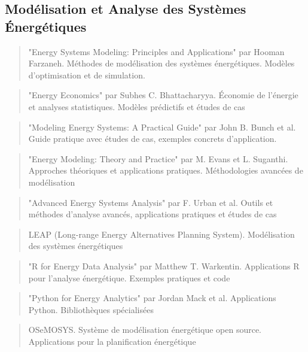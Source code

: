 \documentclass[a4paper,11pt]{report}
\begin{document}
\subsection{Modélisation et Analyse des Systèmes Énergétiques}\label{moduxe9lisation-et-analyse-des-systuxe8mes-uxe9nerguxe9tiques}

\begin{quote}
"Energy Systems Modeling: Principles and Applications" par Hooman Farzaneh. Méthodes de modélisation des systèmes énergétiques. Modèles d'optimisation et de simulation.
\end{quote}

\begin{quote}
"Energy Economics" par Subhes C. Bhattacharyya. Économie de l'énergie et analyses statistiques. Modèles prédictifs et études de cas
\end{quote}

\begin{quote}
"Modeling Energy Systems: A Practical Guide" par John B. Bunch et al. Guide pratique avec études de cas, exemples concrets d'application.
\end{quote}

\begin{quote}
"Energy Modeling: Theory and Practice" par M. Evans et L. Suganthi. Approches théoriques et applications pratiques. Méthodologies avancées de modélisation
\end{quote}

\begin{quote}
"Advanced Energy Systems Analysis" par F. Urban et al. Outils et méthodes d'analyse avancés, applications pratiques et études de cas
\end{quote}

\begin{quote}
LEAP (Long-range Energy Alternatives Planning System). Modélisation des systèmes énergétiques
\end{quote}

\begin{quote}
"R for Energy Data Analysis" par Matthew T. Warkentin. Applications R pour l'analyse énergétique. Exemples pratiques et code
\end{quote}

\begin{quote}
"Python for Energy Analytics" par Jordan Mack et al. Applications Python. Bibliothèques spécialisées
\end{quote}

\begin{quote}
OSeMOSYS. Système de modélisation énergétique open source. Applications pour la planification énergétique
\end{quote}
\end{document}
